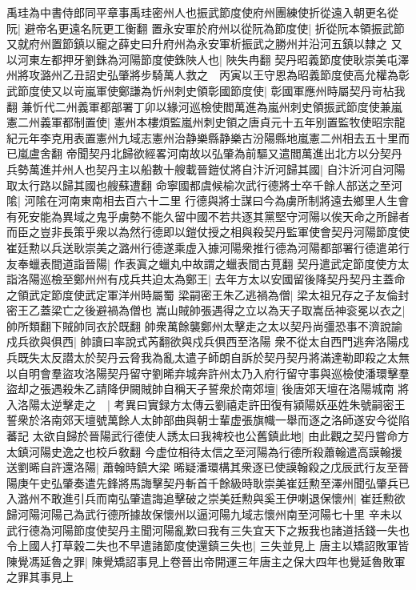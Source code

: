 禹珪為中書侍郎同平章事禹珪密州人也振武節度使府州團練使折從遠入朝更名從阮|{
	避帝名更遠名阮更工衡翻}
置永安軍於府州以從阮為節度使|{
	折從阮本領振武節又就府州置節鎮以寵之薛史曰升府州為永安軍析振武之勝州并沿河五鎮以隸之}
又以河東左都押牙劉銖為河陽節度使銖陜人也|{
	陜失冉翻}
契丹昭義節度使耿崇美屯澤州將攻潞州乙丑詔史弘肇將步騎萬人救之　丙寅以王守恩為昭義節度使高允權為彰武節度使又以岢嵐軍使鄭謙為忻州刺史領彰國節度使|{
	彰國軍應州時屬契丹岢枮我翻}
兼忻代二州義軍都部署丁卯以緣河巡檢使閻萬進為嵐州刺史領振武節度使兼嵐憲二州義軍都制置使|{
	憲州本樓煩監嵐州刺史領之唐貞元十五年别置監牧使昭宗龍紀元年李克用表置憲州九域志憲州治静樂縣静樂古汾陽縣地嵐憲二州相去五十里而已嵐盧舍翻}
帝聞契丹北歸欲經畧河南故以弘肇為前驅又遣閻萬進出北方以分契丹兵勢萬進并州人也契丹主以船數十艘載晉鎧仗將自汴沂河歸其國|{
	自汴沂河自河陽取太行路以歸其國也艘蘇遭翻}
命寧國都虞候榆次武行德將士卒千餘人部送之至河隂|{
	河隂在河南東南相去百六十二里}
行德與將士謀曰今為虜所制將遠去鄉里人生會有死安能為異域之鬼乎虜勢不能久留中國不若共逐其黨堅守河陽以俟天命之所歸者而臣之豈非長策乎衆以為然行德即以鎧仗授之相與殺契丹監軍使會契丹河陽節度使崔廷勲以兵送耿崇美之潞州行德遂乘虚入據河陽衆推行德為河陽都部署行德遣弟行友奉蠟表間道詣晉陽|{
	作表寘之蠟丸中故謂之蠟表間古莧翻}
契丹遣武定節度使方太詣洛陽巡檢至鄭州州有戍兵共迫太為鄭王|{
	去年方太以安國留後降契丹契丹主蓋命之領武定節度使武定軍洋州時屬蜀}
梁嗣密王朱乙逃禍為僧|{
	梁太祖兄存之子友倫封密王乙蓋梁亡之後避禍為僧也}
嵩山賊帥張遇得之立以為天子取嵩岳神衮冕以衣之|{
	帥所類翻下賊帥同衣於既翻}
帥衆萬餘襲鄭州太擊走之太以契丹尚彊恐事不濟說諭戍兵欲與俱西|{
	帥讀曰率說式芮翻欲與戍兵俱西至洛陽}
衆不從太自西門逃奔洛陽戍兵既失太反譛太於契丹云脅我為亂太遣子師朗自訴於契丹契丹將滿達勒即殺之太無以自明會羣盜攻洛陽契丹留守劉晞弃城奔許州太乃入府行留守事與巡檢使潘環擊羣盜却之張遇殺朱乙請降伊闕賊帥自稱天子誓衆於南郊壇|{
	後唐郊天壇在洛陽城南}
將入洛陽太逆擊走之　|{
	考異曰實録方太傳云劉禧走許田復有潁陽妖巫姓朱號嗣密王誓衆於洛南郊天壇號萬餘人太帥部曲與朝士輩虚張旗幟一舉而逐之洛師遂安今從陷蕃記}
太欲自歸於晉陽武行德使人誘太曰我裨校也公舊鎮此地|{
	由此觀之契丹嘗命方太鎮河陽史逸之也校戶敎翻}
今虚位相待太信之至河陽為行德所殺蕭翰遣高謨翰援送劉晞自許還洛陽|{
	蕭翰時鎮大梁}
晞疑潘環構其衆逐已使謨翰殺之戊辰武行友至晉陽庚午史弘肇奏遣先鋒將馬誨擊契丹斬首千餘級時耿崇美崔廷勲至澤州聞弘肇兵已入潞州不敢進引兵而南弘肇遣誨追擊破之崇美廷勲與奚王伊喇退保懷州|{
	崔廷勲欲歸河陽河陽己為武行德所據故保懷州以逼河陽九域志懷州南至河陽七十里}
辛未以武行德為河陽節度使契丹主聞河陽亂歎曰我有三失宜天下之叛我也諸道括錢一失也令上國人打草穀二失也不早遣諸節度使還鎮三失也|{
	三失並見上}
唐主以矯詔敗軍皆陳覺馮延魯之罪|{
	陳覺矯詔事見上卷晉出帝開運三年唐主之保大四年也覺延魯敗軍之罪其事見上}
